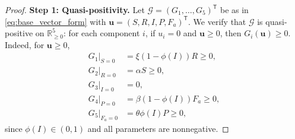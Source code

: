\documentclass[pdflatex,sn-mathphys-ay]{sn-jnl}
\theoremstyle{thmstyleone}
\theoremstyle{definition}
\theoremstyle{remark}
\begin{document}
\begin{proof}
\noindent\textbf{Step 1: Quasi-positivity.}
Let $\mathcal G=(G_1,\dots,G_5)^{\mathsf T}$ be as in \eqref{eq:base_vector_form} with $\mathbf u=(S,R,I,P,F_a)^{\mathsf T}$. 
We verify that $\mathcal G$ is quasi-positive on $\mathbb{R}^5_{\ge 0}$: for each component $i$, if $u_i=0$ and $\mathbf u\ge 0$, then $G_i(\mathbf u)\ge 0$. 
Indeed, for $\mathbf u\ge 0$,
\begin{align*}
G_1\big|_{S=0} &= \xi(1-\phi(I))R \ge 0,\\
G_2\big|_{R=0} &= \alpha S \ge 0,\\
G_3\big|_{I=0} &= 0,\\
G_4\big|_{P=0} &= \beta(1-\phi(I))F_a \ge 0,\\
G_5\big|_{F_a=0} &= \theta\phi(I)P \ge 0,
\end{align*}
since $\phi(I)\in(0,1)$ and all parameters are nonnegative.


\end{proof}
\end{document}
